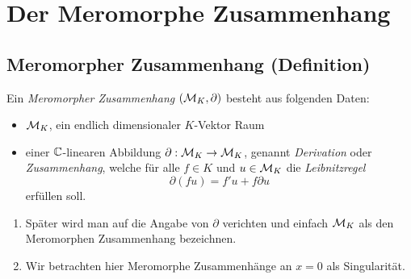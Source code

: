 
\chapter{Der Meromorphe Zusammenhang}
\begin{comment}
\begin{itemize}
\item wofür sind die gut?
\item wieso kommt man ursprünglich dazu
\end{itemize}
\end{comment}

\section{Meromorpher Zusammenhang (Definition)}

\begin{defn} \label{def:merom-zush}
Ein \emph{Meromorpher Zusammenhang}
$(\mathcal{M}_K,\partial)$ besteht aus folgenden Daten:
\begin{itemize}
\item $\mathcal{M}_K$, ein endlich dimensionaler $K$-Vektor Raum
\item einer $\mathbb{C}$-linearen Abbildung $\partial:\mathcal{M}_K\rightarrow \mathcal{M}_K$,
genannt \emph{Derivation} oder \emph{Zusammenhang}, welche für alle $f\in K$
und $u\in \mathcal{M}_K$ die
\emph{Leibnitzregel}
\begin{equation}\label{eq:Leibnitzregel}
\partial(fu)=f'u+f\partial u
\end{equation}
erfüllen soll.
\end{itemize}
\end{defn}

\begin{bem}
\begin{enumerate}
\item Später wird man auf die Angabe von $\partial$ verichten und einfach
$\mathcal{M}_K$ als den Meromorphen Zusammenhang bezeichnen.
\item Wir betrachten hier Meromorphe Zusammenhänge an $x=0$ als
Singularität.
\end{enumerate}
\end{bem}

